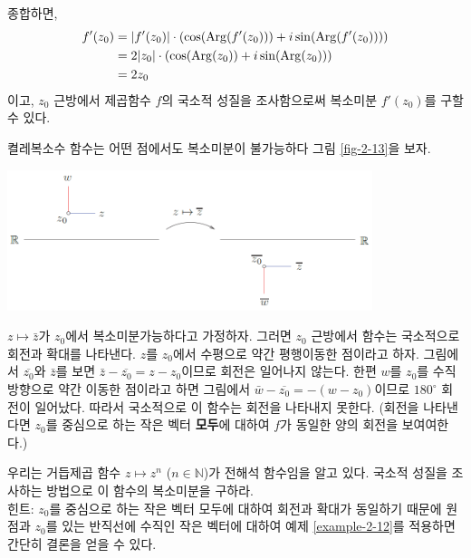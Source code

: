 \begin{saltexample}[label=example-2-12]{}{}
종합하면,
\begin{align*}
f'(z_0) &= |f'(z_0)| \cdot
\left( \cos(\mathop{\mathrm{Arg}}(f'(z_0))) + i \sin(\mathop{\mathrm{Arg}}(f'(z_0))) \right) \\
&= 2|z_0|\cdot \left(\cos(\mathop{\mathrm{Arg}}(z_0)) + i \sin(\mathop{\mathrm{Arg}}(z_0)) \right) \\
&= 2z_0
\end{align*}
이고,
$z_0$ 근방에서 제곱함수 $f$의 국소적 성질을 조사함으로써
복소미분 $f'(z_0)$를 구할 수 있다.
\end{saltexample}

\begin{saltexample}[label=example-2-13]{켤레복소수 함수는 어떤 점에서도 복소미분이 불가능하다}{}
그림 \ref{fig-2-13}을 보자.

\begin{center}
\includegraphics[width=0.8\textwidth]{./SaltChapter/figs/fig-2-13}
\end{center}
\label{fig-2-13}
\saltfigskip

$z\mapsto \bar z$가 $z_0$에서 복소미분가능하다고 가정하자.
그러면 $z_0$ 근방에서 함수는 국소적으로 회전과 확대를 나타낸다.
$z$를 $z_0$에서 수평으로 약간 평행이동한 점이라고 하자.
그림에서 $\overline{z_0}$와 $\bar z$를 보면
$\bar z - \overline{z_0} = z-z_0$이므로 회전은 일어나지 않는다.
한편 $w$를 $z_0$를 수직방향으로 약간 이동한 점이라고 하면
그림에서 $\bar w - \overline{z_0} =  - (w-z_0)$이므로
$180^\circ$ 회전이 일어났다.
따라서 국소적으로 이 함수는 회전을 나타내지 못한다.
(회전을 나타낸다면 $z_0$를 중심으로 하는  작은 벡터 {\bf 모두}에 대하여 
$f$가 동일한 양의 회전을 보여여한다.)
\end{saltexample}

\begin{salt_exercise}\label{ex-2-16}
우리는 거듭제곱 함수 $z\mapsto z^n$ ($n\in\mathbb N$)가 전해석 함수임을 알고 있다.
국소적 성질을 조사하는 방법으로 이 함수의 복소미분을 구하라. \\[1ex]
힌트:  $z_0$를 중심으로 하는  작은 벡터 모두에 대하여
회전과 확대가 동일하기 때문에
원점과 $z_0$를 있는 반직선에 수직인 작은 벡터에 대하여 
예제 \ref{example-2-12}를 적용하면 간단히 결론을 얻을 수 있다.
\end{salt_exercise}

